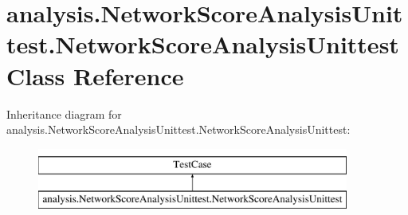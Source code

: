 \hypertarget{classanalysis_1_1NetworkScoreAnalysisUnittest_1_1NetworkScoreAnalysisUnittest}{\section{analysis.\-Network\-Score\-Analysis\-Unittest.\-Network\-Score\-Analysis\-Unittest Class Reference}
\label{classanalysis_1_1NetworkScoreAnalysisUnittest_1_1NetworkScoreAnalysisUnittest}
}
Inheritance diagram for analysis.\-Network\-Score\-Analysis\-Unittest.\-Network\-Score\-Analysis\-Unittest\-:\begin{figure}[H]
\begin{center}
\leavevmode
\includegraphics[height=2.000000cm]{classanalysis_1_1NetworkScoreAnalysisUnittest_1_1NetworkScoreAnalysisUnittest}
\end{center}
\end{figure}
